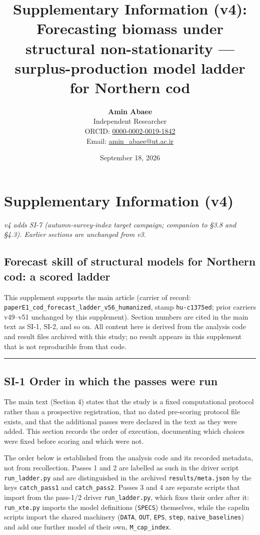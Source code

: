 \documentclass[11pt]{article}
\title{Supplementary Information (v4): Forecasting biomass under structural non-stationarity — surplus-production model ladder for Northern cod}
\author{\textbf{Amin Abaee}\\ Independent Researcher\\[2pt] ORCID: \href{https://orcid.org/0000-0002-0019-1842}{0000-0002-0019-1842}\\ Email: \href{mailto:amin_abaee@ut.ac.ir}{amin_abaee@ut.ac.ir}}
\date{September 18, 2026}
\begin{document}
\maketitle

\section{Supplementary Information
(v4)}\label{supplementary-information-v4}

\emph{v4 adds SI-7 (autumn-survey-index target campaign; companion to
§3.8 and §4.3). Earlier sections are unchanged from v3.}

\subsection{Forecast skill of structural models for Northern cod: a
scored
ladder}\label{forecast-skill-of-structural-models-for-northern-cod-a-scored-ladder}

This supplement supports the main article (carrier of record:
\texttt{paperE1\_cod\_forecast\_ladder\_v56\_humanized}, stamp
\texttt{hu-c1375ed}; prior carriers v49--v51 unchanged by this
supplement). Section numbers are cited in the main text as SI-1, SI-2,
and so on. All content here is derived from the analysis code and result
files archived with this study; no result appears in this supplement
that is not reproducible from that code.

\begin{center}\rule{0.5\linewidth}{0.5pt}\end{center}

\subsection{SI-1 Order in which the passes were
run}\label{si-1-order-in-which-the-passes-were-run}

The main text (Section 4) states that the study is a fixed computational
protocol rather than a prospective registration, that no dated
pre-scoring protocol file exists, and that the additional passes were
declared in the text as they were added. This section records the order
of execution, documenting which choices were fixed before scoring and
which were not.

The order below is established from the analysis code and its recorded
metadata, not from recollection. Passes 1 and 2 are labelled as such in
the driver script \texttt{run\_ladder.py} and are distinguished in the
archived \texttt{results/meta.json} by the keys \texttt{catch\_pass1}
and \texttt{catch\_pass2}. Passes 3 and 4 are separate scripts that
import from the pass-1/2 driver \texttt{run\_ladder.py}, which fixes
their order after it: \texttt{run\_xte.py} imports the model definitions
(\texttt{SPECS}) themselves, while the capelin scripts import the shared
machinery (\texttt{DATA}, \texttt{OUT}, \texttt{EPS}, \texttt{step},
\texttt{naive\_baselines}) and add one further model of their own,
\texttt{M\_cap\_index}.
\end{document}
